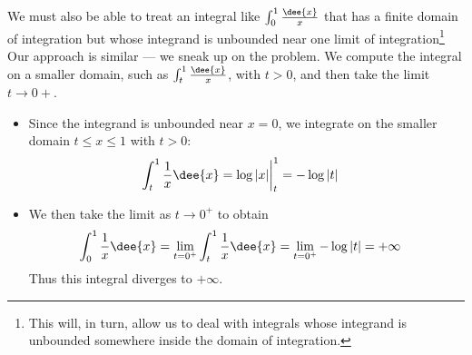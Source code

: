 We must also be able to treat an integral like $\int_0^1\frac{\dee{x}}{x}$
that has a finite domain of integration but whose integrand is unbounded
near one limit of integration\footnote{This will, in turn, allow us to
deal with integrals whose integrand is unbounded somewhere inside the domain of
integration.} Our approach is similar --- we sneak up on the problem.
We compute the integral on a smaller domain, such as $\int_t^1\frac{\dee{x}}{x}$, with
$t>0$, and then take the limit $t\rightarrow 0+$.
\begin{eg}
\soln
\begin{itemize}
 \item Since the integrand is unbounded near $x=0$, we integrate on the smaller domain
$t\leq x \leq 1$ with $t>0$:
\begin{align*}
  \int_t^1 \frac{1}{x}\dee{x}
  &= \log|x| \bigg|_t^1 = -\log|t|
\end{align*}
\item We then take the limit as $t \to 0^+$ to obtain
\begin{align*}
  \int_0^1 \frac{1}{x}\dee{x}
&= \lim_{t=0^+}\int_t^1 \frac{1}{x}\dee{x} = \lim_{t=0^+} -\log|t|
= +\infty
\end{align*}
Thus this integral diverges to $+\infty$.
\end{itemize}
\end{eg}
%


